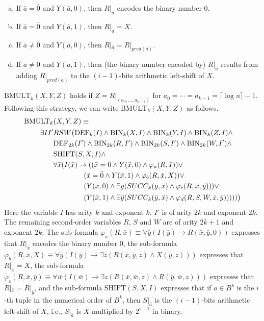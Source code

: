 \documentclass{article}
\begin{document}
\begin{enumerate}[a.]
\item If $\bar{a} = \bar{0}$ and $Y(\bar{a},0)$, then $R|_{\bar{a}}$ encodes the binary number $0$.
\item If $\bar{a} = \bar{0}$ and $Y(\bar{a},1)$, then $R|_{\bar{a}} = X$.
\item If $\bar{a} \neq \bar{0}$ and $Y(\bar{a},0)$, then $R|_{\bar{a}} = R|_{\mathit{pred}(\bar{a})}$.
\item If $\bar{a} \neq \bar{0}$ and $Y(\bar{a},1)$, then (the binary number encoded by) $R|_{\bar{a}}$ results from adding $R|_{\mathit{pred}(\bar{a})}$ to the $(i-1)$-bits arithmetic left-shift of $X$.
\end{enumerate}

$\mathrm{BMULT}_k(X, Y, Z)$ holds if $Z = R|_{(a_0, \ldots, a_{k-1})}$ for $a_0 = \cdots = a_{k-1} = \lceil \log n \rceil -1$. 
Following this strategy, we can write $\mathrm{BMULT}_k(X, Y, Z)$ as follows. 
\begin{align}
\mathrm{BMULT}_k & (X,Y,Z) \equiv \notag \\
\exists I I' & R S W \big(\mathrm{DEF}_k(I) \wedge \mathrm{BIN}_k(X,I) \wedge \mathrm{BIN}_k(Y,I) \wedge \mathrm{BIN}_k(Z,I) \wedge \notag \\
&\mathrm{DEF}_{2k}(I') \wedge \mathrm{BIN}_{2k}(R,I') \wedge \mathrm{BIN}_{2k}(S,I') \wedge \mathrm{BIN}_{2k}(W,I') \wedge \notag \\
&\mathrm{SHIFT}(S, X, I) \wedge \notag \\
&\forall \bar{x} (I(\bar{x}) \to ( (\bar{x} = \bar{0} \wedge Y(\bar{x},0) \wedge \varphi_a(R, \bar{x})) \vee \notag \\
&\hspace*{1.5cm} (\bar{x} = \bar{0} \wedge Y(\bar{x},1) \wedge \varphi_b(R, \bar{x}, X)) \vee \notag \\
&\hspace*{1.5cm} (Y(\bar{x},0) \wedge \exists \bar{y} (SUCC_k(\bar{y},\bar{x}) \wedge \varphi_c(R, \bar{x}, \bar{y}))) \vee \notag \\
&\hspace*{1.5cm} (Y(\bar{x},1) \wedge \exists \bar{y} (SUCC_k(\bar{y},\bar{x}) \wedge \varphi_d(R, S, W, \bar{x}, \bar{y})))))\big) \label{arith9}
\end{align}
Here the variable $I$ has arity $k$ and exponent $k$. $I'$ is of arity $2k$ and exponent $2k$. The remaining second-order variables $R$, $S$ and $W$ are of arity $2k + 1$ and exponent $2k$.
The sub-formula $\varphi_a(R, \bar{x}) \equiv \forall \bar{y} (I(\bar{y}) \to R(\bar{x}, \bar{y}, 0))$  expresses that $R|_{\bar{x}}$ encodes the binary number $0$, the sub-formula $\varphi_b(R, \bar{x}, X) \equiv \forall \bar{y} (I(\bar{y}) \to \exists z(R(\bar{x}, \bar{y}, z) \wedge X(\bar{y}, z)))$ expresses that $R|_{\bar{x}} = X$, the sub-formula $\varphi_c(R, \bar{x}, \bar{y}) \equiv \forall \bar{w} (I(\bar{w}) \to \exists z(R(\bar{x}, \bar{w}, z) \wedge R(\bar{y}, \bar{w}, z)))$ expresses that $R|_{\bar{x}} = R|_{\bar{y}}$, and the sub-formula $\mathrm{SHIFT}(S, X, I)$ expresses that if $\bar{a} \in B^k$ is the $i$-th tuple in the numerical order of $B^k$, then $S|_{\bar{a}}$ is the $(i-1)$-bits arithmetic left-shift of $X$, i.e., $S|_{\bar{a}}$ is $X$ multiplied by $2^{i-1}$ in binary. 
\end{document}

